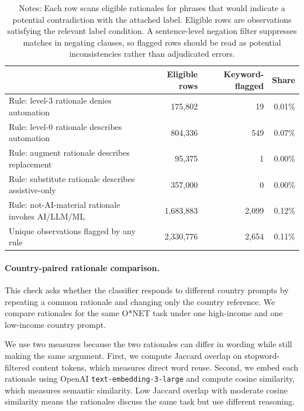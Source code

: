 \documentclass[11pt]{article}
\begin{document}
\begin{table}[H]
\centering
\footnotesize
\caption{Rationale--label consistency check over the task-country level dataset.}
\label{tab:validation_rationale_consistency}
\begin{tabular}{@{}lrrr@{}}
\toprule
 & Eligible rows & Keyword-flagged & Share \\
\midrule
Rule: level-3 rationale denies automation & 175{,}802 & 19 & 0.01\% \\
Rule: level-0 rationale describes automation & 804{,}336 & 549 & 0.07\% \\
Rule: augment rationale describes replacement & 95{,}375 & 1 & 0.00\% \\
Rule: substitute rationale describes assistive-only & 357{,}000 & 0 & 0.00\% \\
Rule: not-AI-material rationale invokes AI/LLM/ML & 1{,}683{,}883 & 2{,}099 & 0.12\% \\
\midrule
Unique observations flagged by any rule & 2{,}330{,}776 & 2{,}654 & 0.11\% \\
\bottomrule
\end{tabular}
\caption*{\scriptsize Notes: Each row scans eligible rationales for phrases that would indicate a potential contradiction with the attached label. Eligible rows are observations satisfying the relevant label condition. A sentence-level negation filter suppresses matches in negating clauses, so flagged rows should be read as potential inconsistencies rather than adjudicated errors.}
\end{table}

\paragraph{Country-paired rationale comparison.} This check asks whether the classifier responds to different country prompts by repeating a common rationale and changing only the country reference. We compare rationales for the same O*NET task under one high-income and one low-income country prompt.

We use two measures because the two rationales can differ in wording while still making the same argument. First, we compute Jaccard overlap on stopword-filtered content tokens, which measures direct word reuse. Second, we embed each rationale using OpenAI \texttt{text-embedding-3-large} and compute cosine similarity, which measures semantic similarity. Low Jaccard overlap with moderate cosine similarity means the rationales discuss the same task but use different reasoning.
\end{document}
